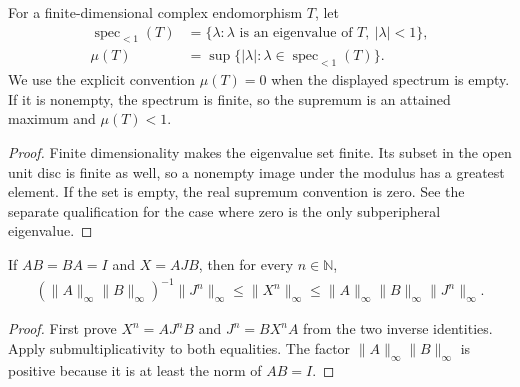 
\begin{definition}
    \label{def:wolf_subperipheral_modulus}
    \leanok
    For a finite-dimensional complex endomorphism $T$, let
    \begin{align}
      \operatorname{spec}_{<1}(T)
        &=\{\lambda:\lambda\text{ is an eigenvalue of }T,
             \ |\lambda|<1\},\\
      \mu(T)&=\sup\{|\lambda|:\lambda\in
             \operatorname{spec}_{<1}(T)\}.
    \end{align}
    We use the explicit convention $\mu(T)=0$ when the displayed spectrum is
    empty.  If it is nonempty, the spectrum is finite, so the supremum is an
    attained maximum and $\mu(T)<1$.
\end{definition}

\begin{proof}
    \leanok
    Finite dimensionality makes the eigenvalue set finite.  Its subset in the
    open unit disc is finite as well, so a nonempty image under the modulus has
    a greatest element.  If the set is empty, the real supremum convention is
    zero.  See the separate qualification for the case where zero is the only
    subperipheral eigenvalue.
\end{proof}

\begin{lemma}
    \label{lem:wolf_jordan_similarity_comparison}
    \leanok
    If $AB=BA=I$ and $X=AJB$, then for every $n\in\mathbb N$,
    \begin{align}
      (\lVert A\rVert_\infty\lVert B\rVert_\infty)^{-1}
        \lVert J^n\rVert_\infty
      \le \lVert X^n\rVert_\infty
      \le \lVert A\rVert_\infty\lVert B\rVert_\infty
        \lVert J^n\rVert_\infty.
    \end{align}
\end{lemma}

\begin{proof}
    \leanok
    First prove $X^n=AJ^nB$ and $J^n=BX^nA$ from the two inverse identities.
    Apply submultiplicativity to both equalities.  The factor
    $\lVert A\rVert_\infty\lVert B\rVert_\infty$ is positive because it is at
    least the norm of $AB=I$.

\end{proof}


